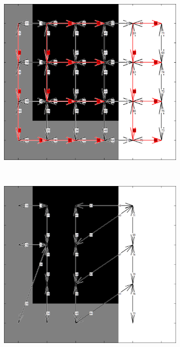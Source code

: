 \documentclass[12pt]{article}
\begin{document}
\begin{figure}[tb]
  \centering

    \begin{subfigure}[b]{0.3\textwidth}
      \includegraphics[width=\textwidth]{img/simply2.jpg}
      \caption{}\label{fig:dart_simply2}
    \end{subfigure}
    ~
    \begin{subfigure}[b]{0.3\textwidth}
      \includegraphics[width=\textwidth]{img/simply3.jpg}

\end{subfigure}
\end{figure}
\end{document}
